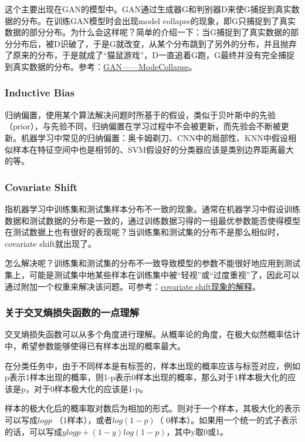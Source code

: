 这个主要出现在GAN的模型中。GAN通过生成器G和判别器D来使G捕捉到真实数据的分布。在训练GAN模型时会出现model collapse的现象，即G只捕捉到了真实数据的部分分布。为什么会这样呢？简单的介绍一下：当G捕捉到了真实数据的部分分布后，被D识破了，于是G就改变，从某个分布跳到了另外的分布，并且抛弃了原来的分布，于是就成了“猫鼠游戏”，D一直追着G跑，G最终并没有完全捕捉到真实数据的分布。参考：\href{https://blog.csdn.net/SPARKKKK/article/details/72598041}{GAN——ModeCollapse}。

\subsubsection{Inductive Bias}
归纳偏置，使用某个算法解决问题时所基于的假设，类似于贝叶斯中的先验（prior），与先验不同，归纳偏置在学习过程中不会被更新，而先验会不断被更新。机器学习中常见的归纳偏置：奥卡姆剃刀、CNN中的局部性、KNN中假设相似样本在特征空间中也是相邻的、SVM假设好的分类器应该是类别边界距离最大的等。

\subsubsection{Covariate Shift}
指机器学习中训练集和测试集样本分布不一致的现象。通常在机器学习中假设训练数据和测试数据的分布是一致的，通过训练数据习得的一组最优参数能否使得模型在测试数据上也有很好的表现呢？当训练集和测试集的分布不是那么相似时，covariate shift就出现了。

怎么解决呢？训练集和测试集的分布不一致导致模型的参数不能很好地应用到测试集上，可能是测试集中地某些样本在训练集中被“轻视”或“过度重视”了，因此可以通过附加一个权重来解决该问题。可参考：\href{https://blog.csdn.net/mao_xiao_feng/article/details/54317852}{covariate shift现象的解释}。

\subsubsection{关于交叉熵损失函数的一点理解}
交叉熵损失函数可以从多个角度进行理解。从概率论的角度，在极大似然概率估计中，希望参数能够使得已有样本出现的概率最大。

在分类任务中，由于不同样本是有标签的，样本出现的概率应该与标签对应，例如p表示1样本出现的概率，则1-p表示0样本出现的概率，那么对于1样本极大化的应该是p，对于0样本极大化的应该是1-p。

样本的极大化后的概率取对数后为相加的形式。则对于一个样本，其极大化的表示可以写成$log p$ （1样本），或者$log(1-p)$（ 0样本）。如果用一个统一的式子表示的话，可以写成$y log p + (1-y) log(1-p)$，其中y取0或1。

